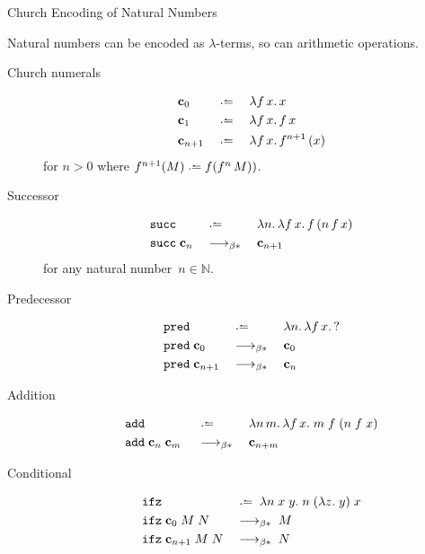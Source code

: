 \begin{frame}[allowframebreaks]{Church Encoding of Natural Numbers}

  Natural numbers can be encoded as $\lambda$-terms, so can arithmetic operations. 
  \begin{description}
    \item[Church numerals] 
      \begin{align*}
        &\bc_0 &&\defeq\;&& \lambda f\,x.\, x \\
        &\bc_{1} &&\defeq\;&& \lambda f\,x.\, f\,x \\
        &\bc_{n+1} &&\defeq\;&& \lambda f\,x.\, f^{n+1}\,(x)
      \end{align*}
      for $n > 0$ where $f^{n+1}(M)  \defeq f (f^n\, M))$.
    \item[Successor]
      \begin{align*}
        & \mathtt{succ} && \defeq\; && \lambda n.\,\lambda f\,x.\, f\,(n\,f\,x) \\
        & \mathtt{succ}\;\bc_n && \reduce\; && \bc_{n+1}
      \end{align*}
      for any natural number~$n \in \mathbb{N}$.
    \item[Predecessor]
      \begin{align*}
        & \mathtt{pred} && \defeq\; && \lambda n.\, \lambda f\,x.\, ? \\
        & \mathtt{pred}\;\bc_{0}  && \reduce\; && \bc_{0} \\
        & \mathtt{pred}  \;\bc_{n+1} && \reduce\; && \bc_{n}
      \end{align*}
    \item[Addition]
      \begin{align*}
        & \mathtt{add} && \defeq\; && \lambda n\,m.\,\lambda f\,x.\;
        m\;f\;(n\;f\;x)  \\ & \mathtt{add}\;\bc_{n}\;\bc_{m}\;
                            && \reduce\; && \bc_{n + m}
      \end{align*}
    \item[Conditional]
      \begin{align*}
        & \mathtt{ifz} && \defeq \; \lambda n\;x\;y.\;n\;(\lambda z.\;y)\;x 
        \\
        & \mathtt{ifz}\;\bc_0\;M\;N && \reduce \; M \\
        & \mathtt{ifz}\;\bc_{n+1}\;M\;N && \reduce \; N
      \end{align*}
  \end{description}
\end{frame}


